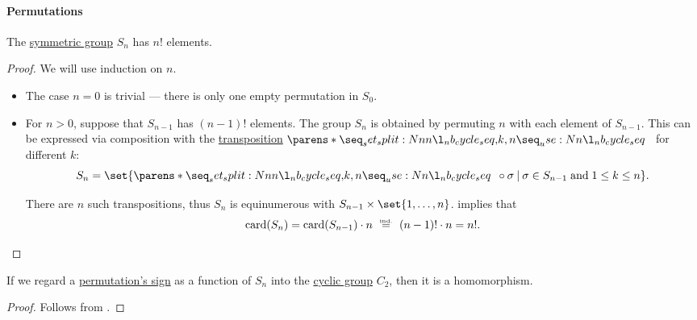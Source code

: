 \paragraph{Permutations}

\begin{proposition}\label{thm:symmetric_group_cardinality}
  The \hyperref[def:symmetric_group]{symmetric group} \( S_n \) has \( n! \) elements.
\end{proposition}
\begin{proof}
  We will use induction on \( n \).

  \begin{itemize}
    \item The case \( n = 0 \) is trivial --- there is only one empty permutation in \( S_0 \).

    \item For \( n > 0 \), suppose that \( S_{n - 1} \) has \( (n - 1)! \) elements. The group \( S_n \) is obtained by permuting \( n \) with each element of \( S_{n - 1} \). This can be expressed via composition with the \hyperref[def:transposition]{transposition} \( \cycle{ k, n } \) for different \( k \):
    \begin{equation*}
      S_n = \set{ \cycle{ k, n } \bincirc \sigma \given \sigma \in S_{n-1} \T{and} 1 \leq k \leq n }.
    \end{equation*}

    There are \( n \) such transpositions, thus \( S_n \) is equinumerous with \( S_{n-1} \times \set{ 1, \ldots, n } \).  implies that
    \begin{equation*}
      \card(S_n)
      =
      \card(S_{n-1}) \cdot n
      \reloset {\T{ind.}} =
      (n - 1)! \cdot n
      =
      n!.
    \end{equation*}
  \end{itemize}
\end{proof}

\begin{lemma}\label{thm:permutation_parity_homomorphism}
  If we regard a \hyperref[def:permutation_parity]{permutation's sign} as a function of \( S_n \) into the \hyperref[def:cyclic_group]{cyclic group} \( C_2 \), then it is a homomorphism.
\end{lemma}
\begin{proof}
  Follows from .
\end{proof}


